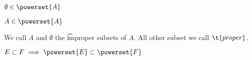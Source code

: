 \begin{proposition}
  $\emptyset \in \powerset{A}$
\end{proposition}

\begin{proposition}
  $A \in \powerset{A}$
\end{proposition}

We call $A$ and $\emptyset$ the \t{improper} subsets of $A$.
All other subset we call $\t{proper}$.


\begin{proposition}
  $E \subset F \implies \powerset{E} \subset \powerset{F}$
\end{proposition}

